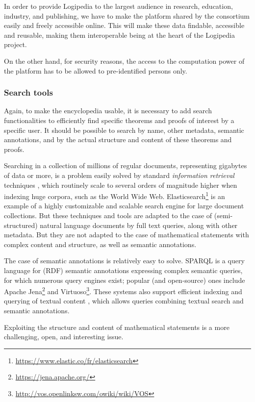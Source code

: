 In order to provide Logipedia to the largest audience in research,
education, industry, and publishing, we have to make the platform
shared by the consortium easily and freely accessible online. This
will make these data findable, accessible and reusable,
making them interoperable being at the heart of the Logipedia project.

On the other hand, for security reasons, the access to the computation
power of the platform has to be allowed to pre-identified persons only.

\subsubsection*{Search tools}

Again, to make the encyclopedia usable, it is necessary to add search
functionalities to efficiently find specific theorems and proofs of
interest by a specific user. It should be possible to search by name,
other metadata, semantic annotations, and by the actual structure and
content of these theorems and proofs.

Searching in a collection of millions of regular documents,
representing gigabytes of data or more, is a problem easily solved by
standard \emph{information retrieval} techniques
\cite{DBLP:books/daglib/0021593}, which routinely scale to several
orders of magnitude higher when indexing huge corpora, such as the
World Wide Web.
Elasticsearch\footnote{\url{https://www.elastic.co/fr/elasticsearch}}
is an example of a highly customizable and scalable search engine for
large document collections. But these techniques and tools are adapted
to the case of (semi-structured) natural language documents by full
text queries, along with other metadata. But they are not adapted to
the case of mathematical statements with complex content and
structure, as well as semantic annotations.

The case of semantic annotations is relatively easy to solve. SPARQL
\cite{sparql} is a
query language for (RDF) semantic annotations expressing complex semantic
queries, for which numerous
query engines exist; popular (and open-source) ones include
Apache Jena\footnote{\url{https://jena.apache.org/}} and
Virtuoso\footnote{\url{http://vos.openlinksw.com/owiki/wiki/VOS}}. These
systems also support efficient indexing and querying of textual content
\cite{DBLP:conf/esws/MinackSN09}, which allows queries combining textual
search and semantic annotations.

Exploiting the structure and content of mathematical statements is a more
challenging, open, and interesting issue.


